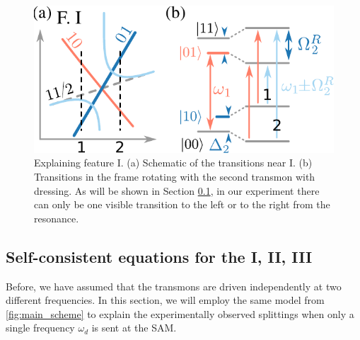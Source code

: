 \documentclass[%
 aps, prx,
 amsmath,amssymb,
 reprint,%
superscriptaddress
]{revtex4-2}
\begin{document}
\begin{figure}
	\includegraphics[width=.9\linewidth]{topo_scheme}
	\caption{Explaining feature I. (a) Schematic of the transitions near I. (b) Transitions in the frame rotating with the second transmon with dressing. As will be shown in Section \ref{sec:münchhausen}, in our experiment there can only be one visible transition to the left or to the right from the resonance.}
	\label{fig:featureI}
\end{figure} 



\subsection{Self-consistent equations for the I, II, III}
\label{sec:münchhausen}

Before, we have assumed that the transmons are driven independently at two different frequencies. In this section, we will employ the same model from \autoref{fig:main_scheme} to explain the experimentally observed splittings when only a single frequency $\omega_d$ is sent at the SAM. 
\end{document}
